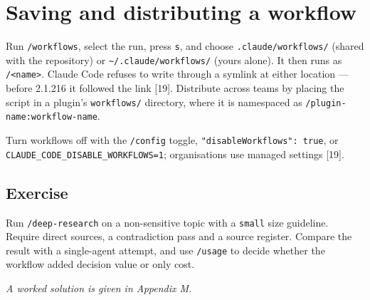 \documentclass[11pt,a4paper,twoside,openany]{book}
\begin{document}
\FloatBarrier
\setcounter{section}{5}
\section{Saving and distributing a workflow}

Run \texttt{/\allowbreak{}workflows}, select the run, press \texttt{s}, and choose \texttt{.\allowbreak{}claude/\allowbreak{}workflows/\allowbreak{}} (shared with the repository) or \texttt{\textasciitilde{}/\allowbreak{}.\allowbreak{}claude/\allowbreak{}workflows/\allowbreak{}} (yours alone). It then runs as \texttt{/\allowbreak{}<name>}. Claude Code refuses to write through a symlink at either location — before 2.1.216 it followed the link [19]. Distribute across teams by placing the script in a plugin's \texttt{workflows/\allowbreak{}} directory, where it is namespaced as \texttt{/\allowbreak{}plugin-\allowbreak{}name:\allowbreak{}workflow-\allowbreak{}name}.


Turn workflows off with the \texttt{/\allowbreak{}config} toggle, \texttt{"disable\allowbreak{}Workflows":\allowbreak{} true}, or \texttt{CLAUDE\_\allowbreak{}CODE\_\allowbreak{}DISABLE\_\allowbreak{}WORKFLOWS=\allowbreak{}1}; organisations use managed settings [19].


\subsection*{Exercise}

Run \texttt{/\allowbreak{}deep-\allowbreak{}research} on a non-sensitive topic with a \texttt{small} size guideline. Require direct sources, a contradiction pass and a source register. Compare the result with a single-agent attempt, and use \texttt{/\allowbreak{}usage} to decide whether the workflow added decision value or only cost.


\emph{A worked solution is given in Appendix M.}
\end{document}
